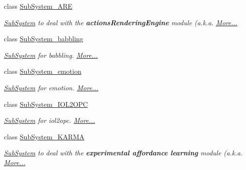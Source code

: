 \begin{DoxyCompactItemize}
class \hyperlink{group__icubclient__subsystems_classicubclient_1_1SubSystem__ARE}{Sub\+System\+\_\+\+A\+RE}
\begin{DoxyCompactList}\small\item\em \hyperlink{group__icubclient__subsystems_classicubclient_1_1SubSystem}{Sub\+System} to deal with the {\bfseries actions\+Rendering\+Engine} module (a.\+k.\+a.  \hyperlink{group__icubclient__subsystems_classicubclient_1_1SubSystem__ARE}{More...}\end{DoxyCompactList}\item 
class \hyperlink{group__icubclient__subsystems_classicubclient_1_1SubSystem__babbling}{Sub\+System\+\_\+babbling}
\begin{DoxyCompactList}\small\item\em \hyperlink{group__icubclient__subsystems_classicubclient_1_1SubSystem}{Sub\+System} for babbling.  \hyperlink{group__icubclient__subsystems_classicubclient_1_1SubSystem__babbling}{More...}\end{DoxyCompactList}\item 
class \hyperlink{group__icubclient__subsystems_classicubclient_1_1SubSystem__emotion}{Sub\+System\+\_\+emotion}
\begin{DoxyCompactList}\small\item\em \hyperlink{group__icubclient__subsystems_classicubclient_1_1SubSystem}{Sub\+System} for emotion.  \hyperlink{group__icubclient__subsystems_classicubclient_1_1SubSystem__emotion}{More...}\end{DoxyCompactList}\item 
class \hyperlink{group__icubclient__subsystems_classicubclient_1_1SubSystem__IOL2OPC}{Sub\+System\+\_\+\+I\+O\+L2\+O\+PC}
\begin{DoxyCompactList}\small\item\em \hyperlink{group__icubclient__subsystems_classicubclient_1_1SubSystem}{Sub\+System} for iol2opc.  \hyperlink{group__icubclient__subsystems_classicubclient_1_1SubSystem__IOL2OPC}{More...}\end{DoxyCompactList}\item 
class \hyperlink{group__icubclient__subsystems_classicubclient_1_1SubSystem__KARMA}{Sub\+System\+\_\+\+K\+A\+R\+MA}
\begin{DoxyCompactList}\small\item\em \hyperlink{group__icubclient__subsystems_classicubclient_1_1SubSystem}{Sub\+System} to deal with the {\bfseries experimental affordance learning} module (a.\+k.\+a.  \hyperlink{group__icubclient__subsystems_classicubclient_1_1SubSystem__KARMA}{More...}\end{DoxyCompactList}\item 

\end{DoxyCompactItemize}
